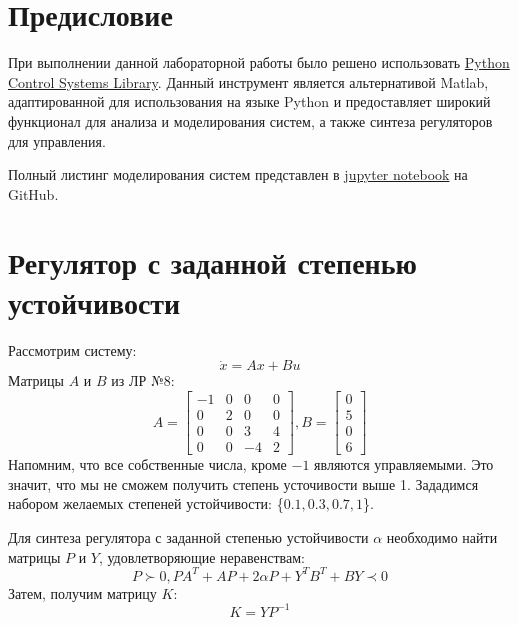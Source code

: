 \tableofcontents
\section*{Предисловие}
При выполнении данной лабораторной работы было решено использовать 
\href{https://python-control.readthedocs.io/en/0.9.4/}{Python Control Systems Library}.
Данный инструмент является альтернативой Matlab, адаптированной для использования на 
языке Python и предоставляет широкий функционал для анализа и моделирования систем,
а также синтеза регуляторов для управления.

Полный листинг моделирования систем представлен в \href{https://github.com/diuzhevVlad/control-theory-itmo-fall-2023/blob/main/Lab9/Lab9.ipynb}{jupyter notebook} на GitHub.

\pagebreak

\section{Регулятор с заданной степенью устойчивости}
Рассмотрим систему:
\begin{equation}
    \dot{x} = Ax + Bu
\end{equation}
Матрицы $A$ и $B$ из ЛР №8:
\begin{equation*}
    A = \begin{bmatrix}
        -1 & 0 & 0 & 0 \\
        0 & 2 & 0 & 0 \\
        0 & 0 & 3 & 4 \\
        0 & 0 & -4 & 2
    \end{bmatrix},
    B = \begin{bmatrix}
        0 \\ 5 \\ 0 \\ 6
    \end{bmatrix}
\end{equation*}
Напомним, что все собственные числа, кроме $-1$ являются управляемыми. Это значит, что мы не 
сможем получить степень усточивости выше 1. Зададимся набором желаемых степеней устойчивости:
\{$0.1,0.3,0.7,1$\}.

Для синтеза регулятора с заданной степенью устойчивости $\alpha$ необходимо найти матрицы $P$ и $Y$,
удовлетворяющие неравенствам:
\begin{equation}
    P \succ 0, PA^T + AP +2\alpha P + Y^TB^T + BY \prec 0
\end{equation}
Затем, получим матрицу $K$:
\begin{equation}
    K = YP^{-1}
\end{equation}


